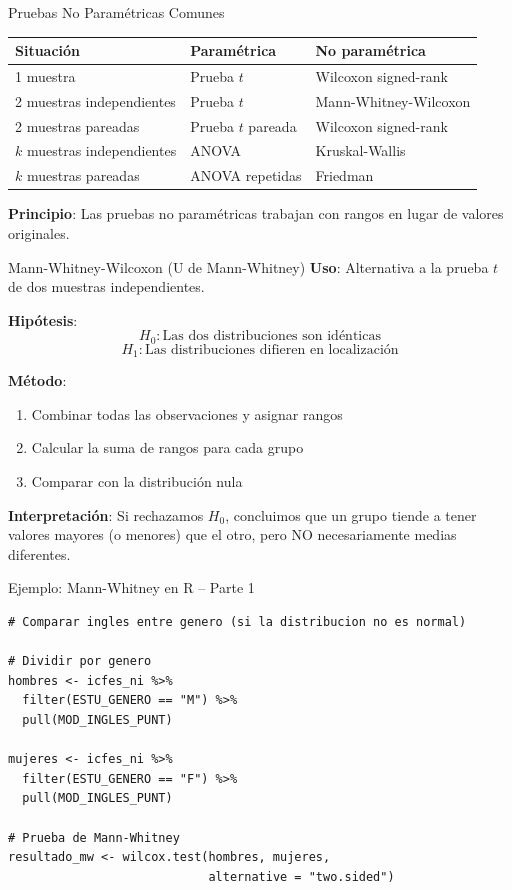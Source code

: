 \documentclass[aspectratio=169, 11pt]{beamer}
\begin{document}
\begin{frame}{Pruebas No Paramétricas Comunes}
\begin{table}
\centering
\small
\begin{tabular}{lll}
\toprule
\textbf{Situación} & \textbf{Paramétrica} & \textbf{No paramétrica} \\
\midrule
1 muestra & Prueba $t$ & Wilcoxon signed-rank \\[0.2cm]
2 muestras independientes & Prueba $t$ & Mann-Whitney-Wilcoxon \\[0.2cm]
2 muestras pareadas & Prueba $t$ pareada & Wilcoxon signed-rank \\[0.2cm]
$k$ muestras independientes & ANOVA & Kruskal-Wallis \\[0.2cm]
$k$ muestras pareadas & ANOVA repetidas & Friedman \\
\bottomrule
\end{tabular}
\end{table}

\vspace{0.3cm}
\textbf{Principio}: Las pruebas no paramétricas trabajan con \alert{rangos} en lugar de valores originales.
\end{frame}

\begin{frame}{Mann-Whitney-Wilcoxon (U de Mann-Whitney)}
\textbf{Uso}: Alternativa a la prueba $t$ de dos muestras independientes.

\vspace{0.3cm}
\textbf{Hipótesis}:
\[
H_0: \text{Las dos distribuciones son idénticas}
\]
\[
H_1: \text{Las distribuciones difieren en localización}
\]

\vspace{0.3cm}
\textbf{Método}:
\begin{enumerate}
  \item Combinar todas las observaciones y asignar rangos
  \item Calcular la suma de rangos para cada grupo
  \item Comparar con la distribución nula
\end{enumerate}

\vspace{0.3cm}
\textbf{Interpretación}: Si rechazamos $H_0$, concluimos que un grupo tiende a tener valores \alert{mayores} (o menores) que el otro, pero NO necesariamente medias diferentes.
\end{frame}

\begin{frame}[fragile]{Ejemplo: Mann-Whitney en R -- Parte 1}
\begin{lstlisting}
# Comparar ingles entre genero (si la distribucion no es normal)

# Dividir por genero
hombres <- icfes_ni %>%
  filter(ESTU_GENERO == "M") %>%
  pull(MOD_INGLES_PUNT)

mujeres <- icfes_ni %>%
  filter(ESTU_GENERO == "F") %>%
  pull(MOD_INGLES_PUNT)

# Prueba de Mann-Whitney
resultado_mw <- wilcox.test(hombres, mujeres,
                            alternative = "two.sided")
\end{lstlisting}
\end{frame}
\end{document}
